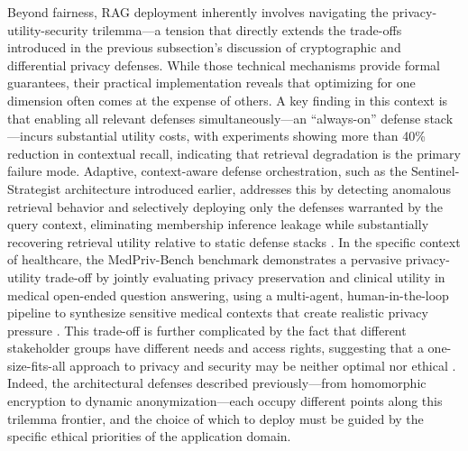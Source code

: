 \documentclass[11pt]{article}
\begin{document}
Beyond fairness, RAG deployment inherently involves navigating the privacy-utility-security trilemma---a tension that directly extends the trade-offs introduced in the previous subsection's discussion of cryptographic and differential privacy defenses. While those technical mechanisms provide formal guarantees, their practical implementation reveals that optimizing for one dimension often comes at the expense of others. A key finding in this context is that enabling all relevant defenses simultaneously---an ``always-on'' defense stack---incurs substantial utility costs, with experiments showing more than 40\% reduction in contextual recall, indicating that retrieval degradation is the primary failure mode. Adaptive, context-aware defense orchestration, such as the Sentinel-Strategist architecture introduced earlier, addresses this by detecting anomalous retrieval behavior and selectively deploying only the defenses warranted by the query context, eliminating membership inference leakage while substantially recovering retrieval utility relative to static defense stacks \cite{ref457}. In the specific context of healthcare, the MedPriv-Bench benchmark demonstrates a pervasive privacy-utility trade-off by jointly evaluating privacy preservation and clinical utility in medical open-ended question answering, using a multi-agent, human-in-the-loop pipeline to synthesize sensitive medical contexts that create realistic privacy pressure \cite{ref502}. This trade-off is further complicated by the fact that different stakeholder groups have different needs and access rights, suggesting that a one-size-fits-all approach to privacy and security may be neither optimal nor ethical \cite{ref503}. Indeed, the architectural defenses described previously---from homomorphic encryption to dynamic anonymization---each occupy different points along this trilemma frontier, and the choice of which to deploy must be guided by the specific ethical priorities of the application domain.
\end{document}
